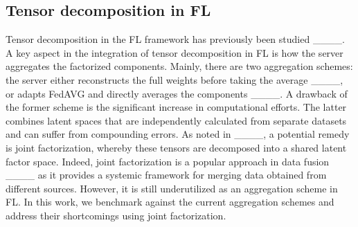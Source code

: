 \subsection{Tensor decomposition in FL}
Tensor decomposition in the FL framework has previously been studied ____. A key aspect in the integration of tensor decomposition in FL is how the server aggregates the factorized components. Mainly, there are two aggregation schemes: the server either reconstructs the full weights before taking the average ____, or adapts FedAVG and directly averages the components ____. A drawback of the former scheme is the significant increase in computational efforts. The latter combines latent spaces that are independently calculated from separate datasets and can suffer from compounding errors. As noted in ____, a potential remedy is joint factorization, whereby these tensors are decomposed into a shared latent factor space. Indeed, joint factorization is a popular approach in data fusion ____ as it provides a systemic framework for merging data obtained from different sources. However, it is still underutilized as an aggregation scheme in FL. In this work, we benchmark against the current aggregation schemes and address their shortcomings using joint factorization. 

